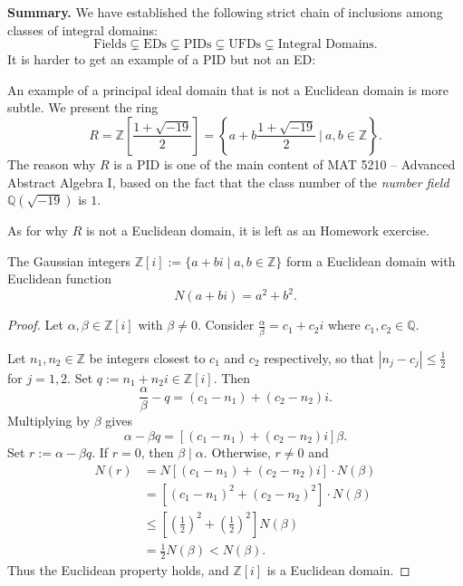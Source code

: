 \noindent \textbf{Summary.} We have established the following strict chain of inclusions among classes of integral domains:
\[
\text{Fields} \subsetneq \text{EDs} \subsetneq \text{PIDs} \subsetneq \text{UFDs} \subsetneq \text{Integral Domains}.
\]
It is harder to get an example of a PID but not an ED:
\begin{example}
An example of a principal ideal domain that is not a Euclidean domain is more subtle. We present the ring
\[
R = \mathbb{Z}\left[\frac{1+\sqrt{-19}}{2}\right] = \left\{a + b\frac{1+\sqrt{-19}}{2} \ \Bigg|\ a, b \in \mathbb{Z}\right\}.
\]
The reason why $R$ is a PID is one of the main content of MAT 5210 -- Advanced Abstract Algebra I, based on the fact that the class number of the {\it number field} $\mathbb{Q}(\sqrt{-19})$ is $1$.


As for why $R$ is not a Euclidean domain, it is left as an Homework exercise. 

\end{example}


\begin{proposition}
The Gaussian integers $\mathbb{Z}[i] := \{a + bi \mid a, b \in \mathbb{Z}\}$ form a Euclidean domain with Euclidean function 
\[
N(a + bi) = a^2 + b^2.
\]
\end{proposition}

\begin{proof}
Let $\alpha, \beta \in \mathbb{Z}[i]$ with $\beta \neq 0$. Consider $\frac{\alpha}{\beta} = c_1 + c_2 i$ where $c_1, c_2 \in \mathbb{Q}$. 

Let $n_1, n_2 \in \mathbb{Z}$ be integers closest to $c_1$ and $c_2$ respectively, so that $|n_j - c_j| \leq \frac{1}{2}$ for $j = 1, 2$. Set $q := n_1 + n_2 i \in \mathbb{Z}[i]$.
Then 
\[
\frac{\alpha}{\beta} - q = (c_1 - n_1) + (c_2 - n_2)i.
\]
Multiplying by $\beta$ gives 
\[
\alpha - \beta q = [(c_1 - n_1) + (c_2 - n_2)i] \beta.
\]
Set $r := \alpha - \beta q$. If $r = 0$, then $\beta \mid \alpha$. Otherwise, $r \neq 0$ and 
\begin{align*}
N(r) &= N[(c_1 - n_1) + (c_2 - n_2)i] \cdot N(\beta) \\
&= [(c_1 - n_1)^2 + (c_2 - n_2)^2] \cdot N(\beta) \\
&\leq \left[\left(\frac{1}{2}\right)^2 + \left(\frac{1}{2}\right)^2\right] N(\beta) \\
&= \frac{1}{2} N(\beta) < N(\beta).
\end{align*}
Thus the Euclidean property holds, and $\mathbb{Z}[i]$ is a Euclidean domain.
\end{proof}


